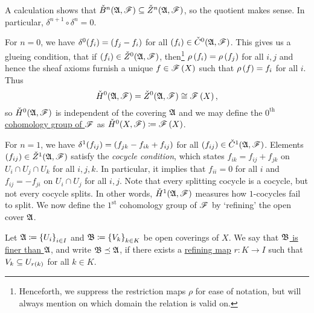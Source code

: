 \documentclass[../Moduli_Spaces_of_Riemann_Surfaces.tex]{subfiles}
\begin{document}
    \vspace{-0.05in}
    \begin{remark}
        A calculation shows that $\check{B}^n\!\left(\mathfrak{A},\mathscr{F}\right)\subseteq\check{Z}^n\!\left(\mathfrak{A},\mathscr{F}\right)$, so the quotient makes sense. In particular, $\delta^{n+1}\circ\delta^n=0$.\exqed
    \end{remark}
    \begin{remark}
        For $n=0$, we have $\delta^0\!\left(f_i\right)=\left(f_j-f_i\right)$ for all $\left(f_i\right)\in\check{C}^0\!\left(\mathfrak{A},\mathscr{F}\right)$. This gives us a glueing condition, that if $\left(f_i\right)\in\check{Z}^0\!\left(\mathfrak{A},\mathscr{F}\right)$, then\footnote{Henceforth, we suppress the restriction maps $\rho$ for ease of notation, but will always mention on which domain the relation is valid on.} $\rho\left(f_i\right)=\rho\left(f_j\right)$ for all $i,j$ and hence the sheaf axioms furnish a unique $f\in\mathscr{F}\left(X\right)$ such that $\rho\left(f\right)=f_i$ for all $i$. Thus
        \begin{equation*}
            \check{H}^0\!\left(\mathfrak{A},\mathscr{F}\right)=\check{Z}^0\!\left(\mathfrak{A},\mathscr{F}\right)\cong\mathscr{F}\left(X\right),
        \end{equation*}
        so $\check{H}^0\!\left(\mathfrak{A},\mathscr{F}\right)$ is independent of the covering $\mathfrak{A}$ and we may define the \ul{$0^\textrm{th}$ cohomology group of $\mathscr{F}$} as $\check{H}^0\!\left(X,\mathscr{F}\right)\coloneqq\mathscr{F}\left(X\right)$.\exqed
    \end{remark}
    \begin{remark}
        For $n=1$, we have $\delta^1\!\left(f_{ij}\right)=\left(f_{jk}-f_{ik}+f_{ij}\right)$ for all $\left(f_{ij}\right)\in\check{C}^1\!\left(\mathfrak{A},\mathscr{F}\right)$. Elements $\left(f_{ij}\right)\in\check{Z}^1\!\left(\mathfrak{A},\mathscr{F}\right)$ satisfy the \textit{cocycle condition}, which states $f_{ik}=f_{ij}+f_{jk}$ on $U_i\cap U_j\cap U_k$ for all $i,j,k$. In particular, it implies that $f_{ii}=0$ for all $i$ and $f_{ij}=-f_{ji}$ on $U_i\cap U_j$ for all $i,j$. Note that every splitting cocycle is a cocycle, but not every cocycle splits. In other words, $\check{H}^1\!\left(\mathfrak{A},\mathscr{F}\right)$ measures how $1$-cocycles fail to split. We now define the $1^\textrm{st}$ cohomology group of $\mathscr{F}$ by `refining' the open cover $\mathfrak{A}$.\exqed
    \end{remark}
    \begin{definition}
        Let $\mathfrak{A}\coloneqq\left\{U_i\right\}_{i\in I}$ and $\mathfrak{B}\coloneqq\left\{V_k\right\}_{k\in K}$ be open coverings of $X$. We say that \ul{$\mathfrak{B}$ is finer than $\mathfrak{A}$}, and write $\mathfrak{B}\preceq\mathfrak{A}$, if there exists a \ul{refining map} $r:K\to I$ such that $V_k\subseteq U_{r\left(k\right)}$ for all $k\in K$.
    \end{definition}
\end{document}
